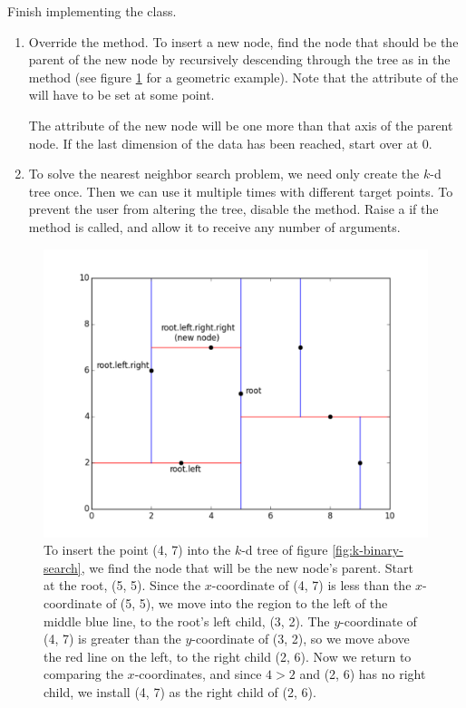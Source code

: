 \begin{problem} %
Finish implementing the  class.
\begin{enumerate}
\item Override the  method.
To insert a new node, find the node that should be the parent of the new node by recursively descending through the tree as in the  method (see figure \ref{fig:k-insert} for a geometric example).
Note that the  attribute of the will have to be set at some point.

The  attribute of the new node will be one more than that axis of the parent node.
If the last dimension of the data has been reached, start  over at 0.

\item To solve the nearest neighbor search problem, we need only create the $k$-d tree once.
Then we can use it multiple times with different target points.
To prevent the user from altering the tree, disable the  method.
Raise a  if the method is called, and allow it to receive any number of arguments.
\end{enumerate}
\end{problem}

\begin{figure}[H]
\includegraphics[width=\textwidth]{figures/kdpic2.pdf}
\caption{To insert the point (4, 7) into the $k$-d tree of figure \ref{fig:k-binary-search}, we find the node that will be the new node's parent. Start at the root, (5, 5). Since the $x$-coordinate of (4, 7) is less than the $x$-coordinate of (5, 5), we move into the region to the left of the middle blue line, to the root's left child, (3, 2). The $y$-coordinate of (4, 7) is greater than the $y$-coordinate of (3, 2), so we move above the red line on the left, to the right child (2, 6). Now we return to comparing the $x$-coordinates, and since $4 > 2$ and (2, 6) has no right child, we install (4, 7) as the right child of (2, 6).}
\label{fig:k-insert}
\end{figure}

